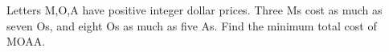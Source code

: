 Letters M,O,A have positive integer dollar prices. Three Ms cost as much as seven Os, and eight Os as much as five As. Find the minimum total cost of MOAA.

